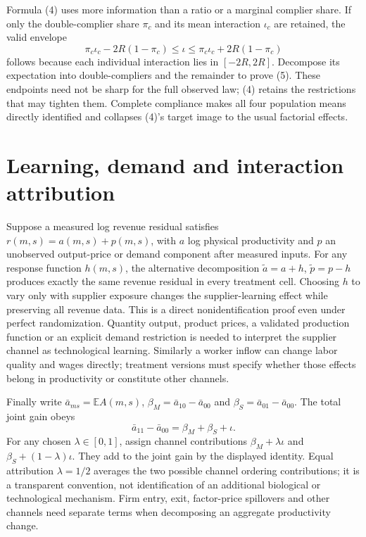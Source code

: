 \documentclass[11pt]{article}
\newcommand{\E}{\mathbb E}
\begin{document}
Formula (4) uses more information than a ratio or a marginal complier
share. If only the double-complier share $\pi_c$ and its mean interaction
$\iota_c$ are retained, the valid envelope
\[
 \pi_c\iota_c-2R(1-\pi_c)\leq\iota
       \leq\pi_c\iota_c+2R(1-\pi_c)                         \tag{5}
\]
follows because each individual interaction lies in $[-2R,2R]$.
Decompose its expectation into double-compliers and the remainder to prove
(5). These endpoints need not be sharp for the full observed law; (4)
retains the restrictions that may tighten them. Complete compliance makes
all four population means directly identified and collapses (4)'s target
image to the usual factorial effects.

\section{Learning, demand and interaction attribution}
Suppose a measured log revenue residual satisfies
$r(m,s)=a(m,s)+p(m,s)$, with $a$ log physical productivity and $p$ an
unobserved output-price or demand component after measured inputs.
For any response function $h(m,s)$, the alternative decomposition
$\widetilde a=a+h$, $\widetilde p=p-h$ produces exactly the same revenue
residual in every treatment cell. Choosing $h$ to vary only with supplier
exposure changes the supplier-learning effect while preserving all
revenue data. This is a direct nonidentification proof even under perfect
randomization. Quantity output, product prices, a validated production
function or an explicit demand restriction is needed to interpret the
supplier channel as technological learning. Similarly a worker inflow can
change labor quality and wages directly; treatment versions must specify
whether those effects belong in productivity or constitute other channels.

Finally write $\bar a_{ms}=\E A(m,s)$,
$\beta_M=\bar a_{10}-\bar a_{00}$ and
$\beta_S=\bar a_{01}-\bar a_{00}$. The total joint gain obeys
\[
 \bar a_{11}-\bar a_{00}=\beta_M+\beta_S+\iota.
\]
For any chosen $\lambda\in[0,1]$, assign channel contributions
$\beta_M+\lambda\iota$ and $\beta_S+(1-\lambda)\iota$.
They add to the joint gain by the displayed identity. Equal attribution
$\lambda=1/2$ averages the two possible channel ordering contributions;
it is a transparent convention, not identification of an additional
biological or technological mechanism. Firm entry, exit, factor-price
spillovers and other channels need separate terms when decomposing an
aggregate productivity change.
\end{document}
